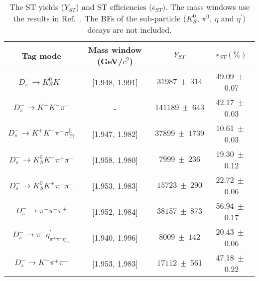 \begin{table}[htbp]
    \caption{ The ST yields ($Y_{ST}$) and ST efficiencies ($\epsilon_{ST}$). 
    The mass windows use the results in Ref.~\cite{Doc-DB-630-v35}. 
The BFs of the sub-particle ($K_{S}^{0}$, $\pi^{0}$, $\eta$ and $\eta^{'}$) decays are not included.}
    \label{ST-eff}
    \begin{center}
        \begin{tabular}{cccc}
            \toprule\toprule
            Tag mode & Mass window (GeV/$c^{2}$)  & $Y_{ST}$  & $\epsilon_{ST}(\%)$\\
            \hline
            $D_{s}^{-} \rightarrow K_{S}^{0}K^{-}$                          & [1.948, 1.991]    & $31987\ \pm\ 314$               & 49.09$\ \pm\ $0.07\\
            $D_{s}^{-} \rightarrow K^{+}K^{-}\pi^{-}$                       & -                 & $141189\ \pm\ 643$              & 42.17$\ \pm\ $0.03\\
            $D_{s}^{-} \rightarrow K^{+}K^{-}\pi^{-}\pi^{0}_{\gamma\gamma}$                & [1.947, 1.982]    & $37899\ \pm\ 1739$              & 10.61$\ \pm\ $0.03\\
            $D_{s}^{-} \rightarrow K_{S}^{0}K^{-}\pi^{+}\pi^{-}$            & [1.958, 1.980]    & $7999\ \pm\ 236$               & 19.30$\ \pm\ $0.12\\
            $D_{s}^{-} \rightarrow K_{S}^{0}K^{+}\pi^{-}\pi^{-}$            & [1.953, 1.983]    & $15723\ \pm\ 290$               & 22.72$\ \pm\ $0.06\\
            $D_{s}^{-} \rightarrow \pi^{-}\pi^{-}\pi^{+}$                   & [1.952, 1.984]    & $38157\ \pm\ 873$              & 56.94$\ \pm\ $0.17\\
            $D_{s}^{-} \rightarrow \pi^{-}\eta_{\pi^{+}\pi^{-}\eta_{\gamma\gamma}}^{'}$          & [1.940, 1.996]    & $8009\ \pm\ 142$               & 20.43$\ \pm\ $0.06\\
            $D_{s}^{-} \rightarrow K^{-}\pi^{+}\pi^{-}$                     & [1.953, 1.983]    & $17112\ \pm\ 561$               & 47.18$\ \pm\ $0.22\\
            \bottomrule\bottomrule
        \end{tabular}
    \end{center}
\end{table}


